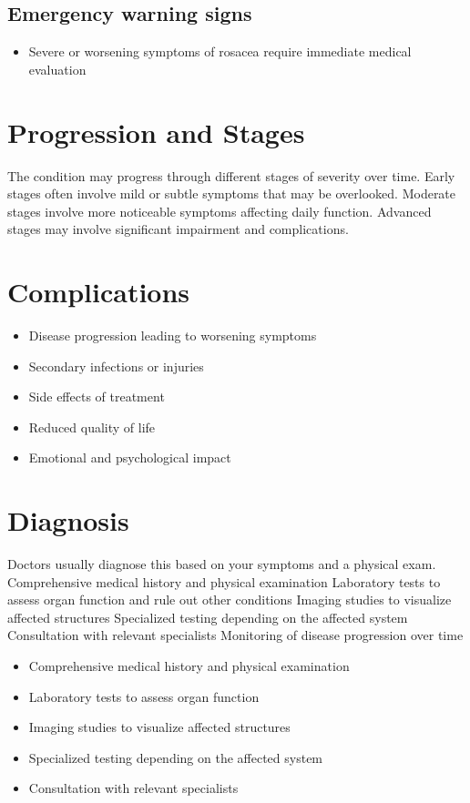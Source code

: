\subsection{Emergency warning signs}
\begin{itemize}[noitemsep]
  \item Severe or worsening symptoms of rosacea require immediate medical evaluation
\end{itemize}
\section{Progression and Stages}
The condition may progress through different stages of severity over time. Early stages often involve mild or subtle symptoms that may be overlooked. Moderate stages involve more noticeable symptoms affecting daily function. Advanced stages may involve significant impairment and complications.
\section{Complications}
\begin{itemize}[noitemsep]
  \item Disease progression leading to worsening symptoms
  \item Secondary infections or injuries
  \item Side effects of treatment
  \item Reduced quality of life
  \item Emotional and psychological impact
\end{itemize}
\section{Diagnosis}
Doctors usually diagnose this based on your symptoms and a physical exam. Comprehensive medical history and physical examination Laboratory tests to assess organ function and rule out other conditions Imaging studies to visualize affected structures Specialized testing depending on the affected system Consultation with relevant specialists Monitoring of disease progression over time

\begin{itemize}[noitemsep]
  \item Comprehensive medical history and physical examination
  \item Laboratory tests to assess organ function
  \item Imaging studies to visualize affected structures
  \item Specialized testing depending on the affected system
  \item Consultation with relevant specialists
\end{itemize}
